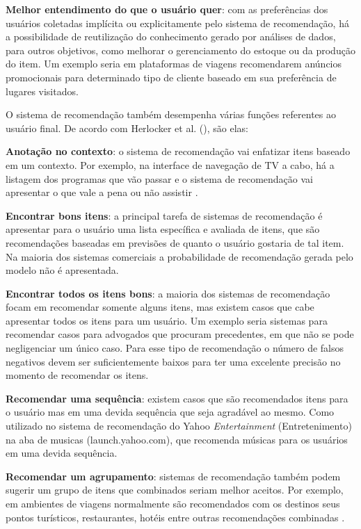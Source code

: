 \textbf{Melhor entendimento do que o usuário quer}: com as preferências dos usuários coletadas implícita ou explicitamente pelo sistema de recomendação, há a possibilidade de reutilização do conhecimento gerado por análises de dados, para outros objetivos, como melhorar o gerenciamento do estoque ou da produção do item. Um exemplo seria em plataformas de viagens recomendarem anúncios promocionais para determinado tipo de cliente baseado em sua preferência de lugares visitados.

O sistema de recomendação também desempenha várias funções referentes ao usuário final. De acordo com Herlocker et al. (\citeyear{Herlocker:2004}), são elas:

\textbf{Anotação no contexto}: o sistema de recomendação vai enfatizar itens baseado em um contexto. Por exemplo, na interface de navegação de TV a cabo, há a listagem dos programas que vão passar e o sistema de recomendação vai apresentar o que vale a pena ou não assistir \cite{Ricci:2010}.

\textbf{Encontrar bons itens}: a principal tarefa de sistemas de recomendação é apresentar para o usuário uma lista específica e avaliada de itens, que são recomendações baseadas em previsões de quanto o usuário gostaria de tal item. Na maioria dos sistemas comerciais a probabilidade de recomendação gerada pelo modelo não é apresentada.

\textbf{Encontrar todos os itens bons}: a maioria dos sistemas de recomendação focam em recomendar somente alguns itens, mas existem casos que cabe apresentar todos os itens para um usuário. Um exemplo seria sistemas para recomendar casos para advogados que procuram precedentes, em que não se pode negligenciar um único caso. Para esse tipo de recomendação o número de falsos negativos devem ser suficientemente baixos para ter uma excelente precisão no momento de recomendar os itens.

\textbf{Recomendar uma sequência}: existem casos que são recomendados itens para o usuário mas em uma devida sequência que seja agradável ao mesmo. Como utilizado no sistema de recomendação do Yahoo \textit{Entertainment} (Entretenimento) na aba de musicas (launch.yahoo.com), que recomenda músicas para os usuários em uma devida sequência.

\textbf{Recomendar um agrupamento}: sistemas de recomendação também podem sugerir um grupo de itens que combinados seriam melhor aceitos. Por exemplo, em ambientes de viagens normalmente são recomendados com os destinos seus pontos turísticos, restaurantes, hotéis entre outras recomendações combinadas \cite{Ricci:2010}.

